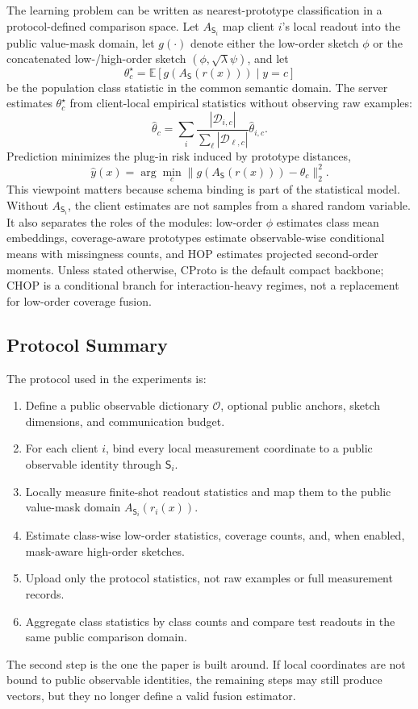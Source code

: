 \documentclass[preprint]{elsarticle}
\newcommand{\schema}{\mathsf{S}}
\newcommand{\E}{\mathbb{E}}
\newcommand{\cD}{\mathcal{D}}
\newcommand{\cO}{\mathcal{O}}
\begin{document}
The learning problem can be written as nearest-prototype classification in a protocol-defined comparison space. Let \(A_{\schema_i}\) map client \(i\)'s local readout into the public value-mask domain, let \(g(\cdot)\) denote either the low-order sketch \(\phi\) or the concatenated low-/high-order sketch \((\phi,\sqrt{\lambda}\psi)\), and let
\begin{equation}
    \theta_c^\star = \E[g(A_{\schema}(r(x)))\mid y=c]
\end{equation}
be the population class statistic in the common semantic domain. The server estimates \(\theta_c^\star\) from client-local empirical statistics without observing raw examples:
\begin{equation}
    \hat{\theta}_c =
    \sum_i
    \frac{|\cD_{i,c}|}{\sum_\ell |\cD_{\ell,c}|}
    \hat{\theta}_{i,c}.
\end{equation}
Prediction minimizes the plug-in risk induced by prototype distances,
\begin{equation}
    \hat{y}(x)=
    \arg\min_c
    \|g(A_{\schema}(r(x)))-\hat{\theta}_c\|_2^2.
\end{equation}
This viewpoint matters because schema binding is part of the statistical model. Without \(A_{\schema_i}\), the client estimates are not samples from a shared random variable. It also separates the roles of the modules: low-order \(\phi\) estimates class mean embeddings, coverage-aware prototypes estimate observable-wise conditional means with missingness counts, and HOP estimates projected second-order moments. Unless stated otherwise, CProto is the default compact backbone; CHOP is a conditional branch for interaction-heavy regimes, not a replacement for low-order coverage fusion.

\subsection{Protocol Summary}

The protocol used in the experiments is:
\begin{enumerate}
    \item Define a public observable dictionary \(\cO\), optional public anchors, sketch dimensions, and communication budget.
    \item For each client \(i\), bind every local measurement coordinate to a public observable identity through \(\schema_i\).
    \item Locally measure finite-shot readout statistics and map them to the public value-mask domain \(A_{\schema_i}(r_i(x))\).
    \item Estimate class-wise low-order statistics, coverage counts, and, when enabled, mask-aware high-order sketches.
    \item Upload only the protocol statistics, not raw examples or full measurement records.
    \item Aggregate class statistics by class counts and compare test readouts in the same public comparison domain.
\end{enumerate}
The second step is the one the paper is built around. If local coordinates are not bound to public observable identities, the remaining steps may still produce vectors, but they no longer define a valid fusion estimator.
\end{document}
